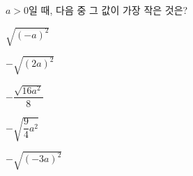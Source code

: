 $a>0$일 때, 다음 중 그 값이 가장 작은 것은?
\begin{choices32}{\rule[-3ex]{0pt}{8ex}$\sqrt{(-a)^2}$}{\rule[-3ex]{0pt}{8ex}$-\sqrt{(2a)^2}$}{\rule[-3ex]{0pt}{8ex}$-\dfrac{\sqrt{16a^2}}{8}$}{\rule[-3ex]{0pt}{8ex}$-\sqrt{\dfrac{9}{4}a^2}$}{\rule[-3ex]{0pt}{8ex}$-\sqrt{(-3a)^2}$}\end{choices32}
